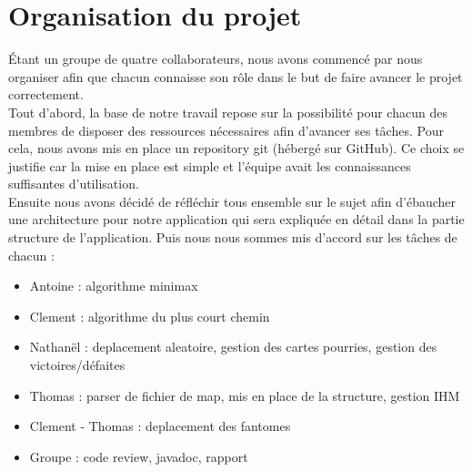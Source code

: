 \section{Organisation du projet}

Étant un groupe de quatre collaborateurs, nous avons commencé par nous organiser afin que chacun connaisse son rôle dans le but de faire avancer le projet correctement. \\
Tout d'abord, la base de notre travail repose sur la possibilité pour chacun des membres de disposer des ressources nécessaires afin d'avancer ses tâches. Pour cela, nous avons mis en place un repository git (hébergé sur GitHub). Ce choix se justifie car la mise en place est simple et l'équipe avait les connaissances suffisantes d'utilisation. \\
Ensuite nous avons décidé de réfléchir tous ensemble sur le sujet afin d'ébaucher une architecture pour notre application qui sera expliquée en détail dans la partie structure de l'application. Puis nous nous sommes mis d'accord sur les tâches de chacun :
\begin{itemize}
	\item Antoine : algorithme minimax
	\item Clement : algorithme du plus court chemin
	\item Nathanël : deplacement aleatoire, gestion des cartes pourries, gestion des victoires/défaites
	\item Thomas : parser de fichier de map, mis en place de la structure, gestion IHM
	\item Clement - Thomas : deplacement des fantomes
	\item Groupe : code review, javadoc, rapport
\end{itemize}